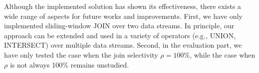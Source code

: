 \documentclass[a4paper, 11pt, twoside]{report}
\begin{document}
Although the implemented solution has shown its effectiveness, there exists a wide range of aspects for future works and improvements. First, we have only implemented sliding-window JOIN over two data streams. In principle, our approach can be extended and used in a variety of operators (e.g., UNION, INTERSECT) over multiple data streams. Second, in the evaluation part, we have only tested the case when the join selectivity $\rho=100\%$, while the case when $\rho$ is not always 100\% remains unstudied.



\cleardoublepage

\renewcommand{\nomname}{List of Notations}
\label{nomenclature}
\printnomenclature

\listoffigures

\listoftables

\cleardoublepage



\cleardoublepage
 
\end{document}

